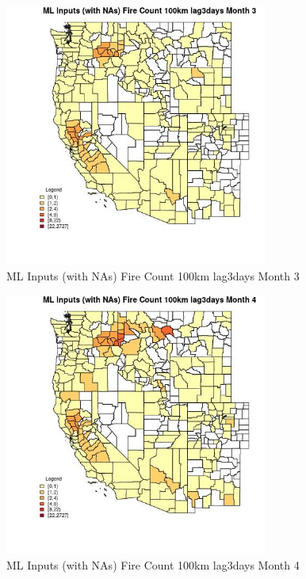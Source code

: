 \clearpage 

\begin{figure} 
\centering  
\includegraphics[width=0.77\textwidth]{Code_Outputs/Report_ML_input_PM25_Step4_part_f_de_duplicated_aves_prioritize_24hr_obswNAs_CountyFire_Count_100km_lag3daysmedianMonth3.jpg} 
\caption{\label{fig:Report_ML_input_PM25_Step4_part_f_de_duplicated_aves_prioritize_24hr_obswNAsCountyFire_Count_100km_lag3daysmedianMonth3}ML Inputs (with NAs) Fire Count 100km lag3days Month 3} 
\end{figure} 
 

\begin{figure} 
\centering  
\includegraphics[width=0.77\textwidth]{Code_Outputs/Report_ML_input_PM25_Step4_part_f_de_duplicated_aves_prioritize_24hr_obswNAs_CountyFire_Count_100km_lag3daysmedianMonth4.jpg} 
\caption{\label{fig:Report_ML_input_PM25_Step4_part_f_de_duplicated_aves_prioritize_24hr_obswNAsCountyFire_Count_100km_lag3daysmedianMonth4}ML Inputs (with NAs) Fire Count 100km lag3days Month 4} 
\end{figure} 
 

